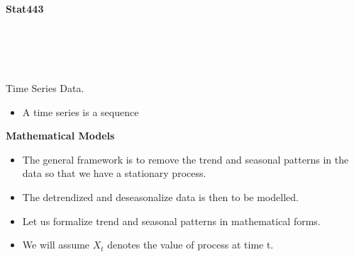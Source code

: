 \documentclass[12pt]{article}
\begin{document}
\vspace*{\fill}

\begin{center}
    \fontsize{25pt}{20pt}\selectfont
    \thispagestyle{empty}
    \textbf{Stat443}\\
    \textbf{}\\
    \\
    \textbf{}\\
    \textbf{}\\
\end{center}
\vspace*{\fill}
\newpage

{
    \fontsize{13pt}{18pt}\selectfont
    \tableofcontents
    
}
\newpage
\newcommand{\add}[1]{{\color{VioletRed} #1}}

\fontsize{12pt}{17pt}\selectfont



\newpage
{}



\begin{definition}
    Time Series Data.
    \begin{itemize}
        \item A time series is a sequence
    \end{itemize}
\end{definition}

\textbf{Mathematical Models}
\begin{itemize}
    \item The general framework is to remove the trend and seasonal patterns in the data so that we have a stationary process.
    \item The detrendized and deseasonalize data is then to be modelled.
    \item Let us formalize trend and seasonal patterns in mathematical forms.
    \item We will assume $X_t$ denotes the value of process at time t.
\end{itemize}
\end{document}
